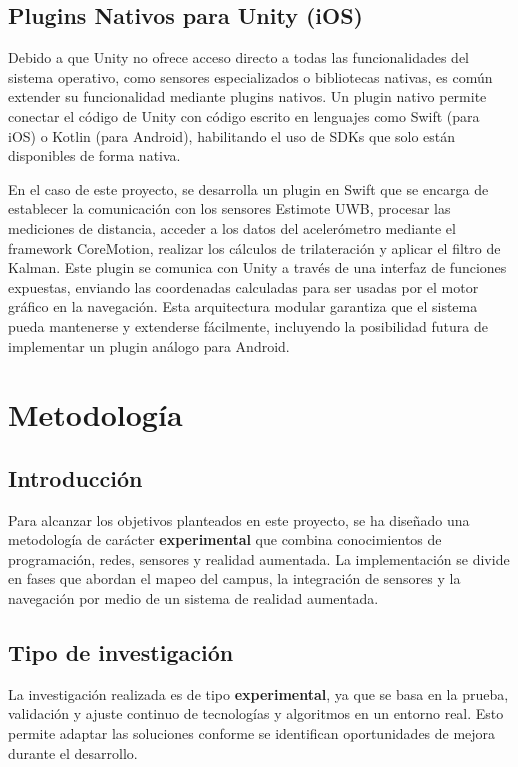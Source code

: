 \documentclass{article}
\begin{document}
\subsection{Plugins Nativos para Unity (iOS)}
{\justify Debido a que Unity no ofrece acceso directo a todas las funcionalidades del sistema operativo, como sensores especializados o bibliotecas nativas, es común extender su funcionalidad mediante plugins nativos. Un plugin nativo permite conectar el código de Unity con código escrito en lenguajes como Swift (para iOS) o Kotlin (para Android), habilitando el uso de SDKs que solo están disponibles de forma nativa.

En el caso de este proyecto, se desarrolla un plugin en Swift que se encarga de establecer la comunicación con los sensores Estimote UWB, procesar las mediciones de distancia, acceder a los datos del acelerómetro mediante el framework CoreMotion, realizar los cálculos de trilateración y aplicar el filtro de Kalman. Este plugin se comunica con Unity a través de una interfaz de funciones expuestas, enviando las coordenadas calculadas para ser usadas por el motor gráfico en la navegación. Esta arquitectura modular garantiza que el sistema pueda mantenerse y extenderse fácilmente, incluyendo la posibilidad futura de implementar un plugin análogo para Android.}


\section{Metodología}
\subsection{Introducción}

Para alcanzar los objetivos planteados en este proyecto, se ha diseñado una metodología de carácter \textbf{experimental} que combina conocimientos de programación, redes, sensores y realidad aumentada. La implementación se divide en fases que abordan el mapeo del campus, la integración de sensores y la navegación por medio de un sistema de realidad aumentada.

\subsection{Tipo de investigación}

La investigación realizada es de tipo \textbf{experimental}, ya que se basa en la prueba, validación y ajuste continuo de tecnologías y algoritmos en un entorno real. Esto permite adaptar las soluciones conforme se identifican oportunidades de mejora durante el desarrollo.
\end{document}
